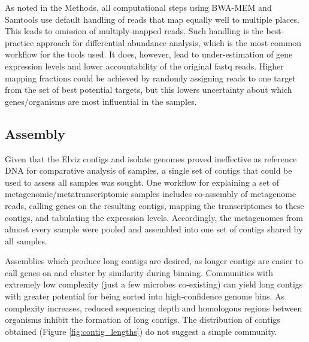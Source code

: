 As noted in the Methods, all computational steps using BWA-MEM and Samtools use default handling of reads that map equally well to multiple places.
This leads to omission of multiply-mapped reads.
Such handling is the best-practice approach for differential abundance analysis, which is the most common workflow for the tools used.
It does, however, lead to under-estimation of gene expression levels and lower accountability of the original fastq reads. %
Higher mapping fractions could be achieved by randomly assigning reads to one target from the set of best potential targets, but this lowers uncertainty about which genes/organisms are most influential in the samples.


\subsection{Assembly}

Given that the Elviz contigs and isolate genomes proved ineffective as reference DNA for comparative analysis of samples, a single set of contigs that could be used to assess all samples was sought.
One workflow for explaining a set of metagenomic/metatranscriptomic samples includes co-assembly of metagenome reads, calling genes on the resulting contigs, mapping the transcriptomes to these contigs, and tabulating the expression levels.
Accordingly, the metagenomes from almost every sample were pooled and assembled into one set of contigs shared by all samples.

Assemblies which produce long contigs are desired, as longer contigs are easier to call genes on and cluster by similarity during binning.
Communities with extremely low complexity (just a few microbes co-existing) can yield long contigs with greater potential for being sorted into high-confidence genome bins. %
As complexity increases, reduced sequencing depth and homologous regions between organisms inhibit the formation of long contigs.
The distribution of contigs obtained (Figure \ref{fig:contig_lengths}) do not suggest a simple community.


